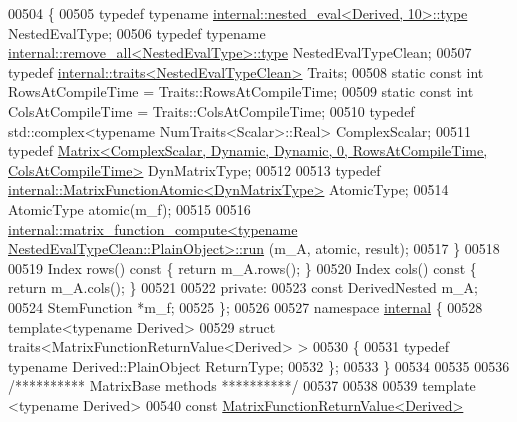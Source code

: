 \begin{DoxyCode}
00504 \textcolor{keyword}{    }\{
00505       \textcolor{keyword}{typedef} \textcolor{keyword}{typename} \hyperlink{class_eigen_1_1internal_1_1_tensor_lazy_evaluator_writable}{internal::nested\_eval<Derived, 10>::type} 
      NestedEvalType;
00506       \textcolor{keyword}{typedef} \textcolor{keyword}{typename} \hyperlink{group___sparse_core___module}{internal::remove\_all<NestedEvalType>::type}
       NestedEvalTypeClean;
00507       \textcolor{keyword}{typedef} \hyperlink{struct_eigen_1_1internal_1_1traits}{internal::traits<NestedEvalTypeClean>} Traits;
00508       \textcolor{keyword}{static} \textcolor{keyword}{const} \textcolor{keywordtype}{int} RowsAtCompileTime = Traits::RowsAtCompileTime;
00509       \textcolor{keyword}{static} \textcolor{keyword}{const} \textcolor{keywordtype}{int} ColsAtCompileTime = Traits::ColsAtCompileTime;
00510       \textcolor{keyword}{typedef} std::complex<typename NumTraits<Scalar>::Real> ComplexScalar;
00511       \textcolor{keyword}{typedef} 
      \hyperlink{group___core___module_class_eigen_1_1_matrix}{Matrix<ComplexScalar, Dynamic, Dynamic, 0, RowsAtCompileTime, ColsAtCompileTime>}
       DynMatrixType;
00512 
00513       \textcolor{keyword}{typedef} \hyperlink{class_eigen_1_1internal_1_1_matrix_function_atomic}{internal::MatrixFunctionAtomic<DynMatrixType>} 
      AtomicType;
00514       AtomicType atomic(m\_f);
00515 
00516       
      \hyperlink{struct_eigen_1_1internal_1_1matrix__function__compute_a55a328773f5254d0cd29ac699bc2634f}{internal::matrix\_function\_compute<typename NestedEvalTypeClean::PlainObject>::run}
      (m\_A, atomic, result);
00517     \}
00518 
00519     Index rows()\textcolor{keyword}{ const }\{ \textcolor{keywordflow}{return} m\_A.rows(); \}
00520     Index cols()\textcolor{keyword}{ const }\{ \textcolor{keywordflow}{return} m\_A.cols(); \}
00521 
00522   \textcolor{keyword}{private}:
00523     \textcolor{keyword}{const} DerivedNested m\_A;
00524     StemFunction *m\_f;
00525 \};
00526 
00527 \textcolor{keyword}{namespace }\hyperlink{namespaceinternal}{internal} \{
00528 \textcolor{keyword}{template}<\textcolor{keyword}{typename} Derived>
00529 \textcolor{keyword}{struct }traits<MatrixFunctionReturnValue<Derived> >
00530 \{
00531   \textcolor{keyword}{typedef} \textcolor{keyword}{typename} Derived::PlainObject ReturnType;
00532 \};
00533 \}
00534 
00535 
00536 \textcolor{comment}{/********** MatrixBase methods **********/}
00537 
00538 
00539 \textcolor{keyword}{template} <\textcolor{keyword}{typename} Derived>
00540 \textcolor{keyword}{const} \hyperlink{class_eigen_1_1_matrix_function_return_value}{MatrixFunctionReturnValue<Derived>} 

\end{DoxyCode}
